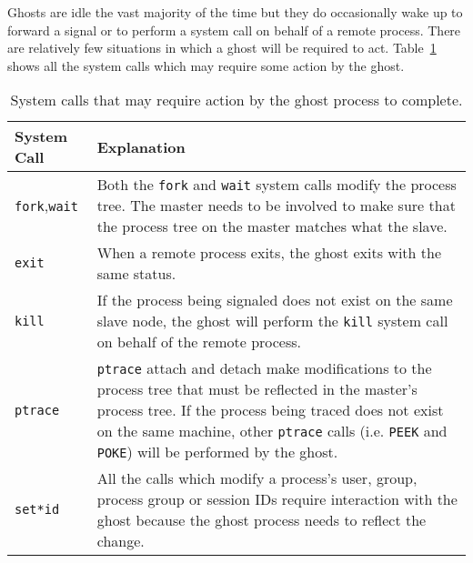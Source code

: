 Ghosts are idle the vast majority of the time but they do occasionally
wake up to forward a signal or to perform a system call on behalf of a
remote process.  There are relatively few situations in which a ghost
will be required to act.  Table~\ref{tab:syscalls} shows all the
system calls which may require some action by the ghost.


\begin{table}
\begin{center}
\begin{tabular}{lp{3.5in}}
\hline
System Call & Explanation \\
\hline
\texttt{fork},\texttt{wait} &

    Both the \texttt{fork} and \texttt{wait} system
    calls modify the process tree.  The master needs to be involved to
    make sure that the process tree on the master matches what the
    slave. \\

\texttt{exit} &

    When a remote process exits, the ghost exits with
    the same status. \\

\texttt{kill} &

    If the process being signaled does not exist on
    the same slave node, the ghost will perform the \texttt{kill}
    system call on behalf of the remote process. \\

%

\texttt{ptrace} &

    \texttt{ptrace} attach and detach make modifications to the
    process tree that must be reflected in the master's process tree.
    If the process being traced does not exist on the same machine,
    other \texttt{ptrace} calls (i.e. \texttt{PEEK} and \texttt{POKE})
    will be performed by the ghost. \\

\texttt{set*id} &

    All the calls which modify a process's user, group, process group
    or session IDs require interaction with the ghost because the
    ghost process needs to reflect the change. \\

\hline
\end{tabular}
\caption{System calls that may require action by the ghost process to
complete.}
\label{tab:syscalls}
\end{center}
\end{table}

